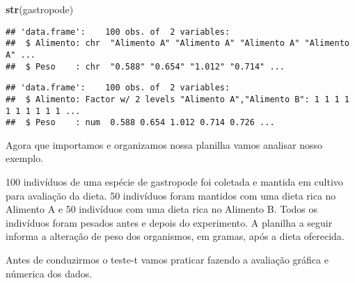 \documentclass[]{book}
\newenvironment{Shaded}{\begin{snugshade}}{\end{snugshade}}
\newcommand{\DataTypeTok}[1]{\textcolor[rgb]{0.13,0.29,0.53}{#1}}
\newcommand{\KeywordTok}[1]{\textcolor[rgb]{0.13,0.29,0.53}{\textbf{#1}}}
\newcommand{\NormalTok}[1]{#1}
\newcommand{\OperatorTok}[1]{\textcolor[rgb]{0.81,0.36,0.00}{\textbf{#1}}}
\newcommand{\StringTok}[1]{\textcolor[rgb]{0.31,0.60,0.02}{#1}}
\begin{document}
\begin{Shaded}
\begin{Highlighting}[]
\KeywordTok{str}\NormalTok{(gastropode)}
\end{Highlighting}
\end{Shaded}

\begin{verbatim}
## 'data.frame':    100 obs. of  2 variables:
##  $ Alimento: chr  "Alimento A" "Alimento A" "Alimento A" "Alimento A" ...
##  $ Peso    : chr  "0.588" "0.654" "1.012" "0.714" ...
\end{verbatim}

\begin{Shaded}
\end{Shaded}

\begin{verbatim}
## 'data.frame':    100 obs. of  2 variables:
##  $ Alimento: Factor w/ 2 levels "Alimento A","Alimento B": 1 1 1 1 1 1 1 1 1 1 ...
##  $ Peso    : num  0.588 0.654 1.012 0.714 0.726 ...
\end{verbatim}

Agora que importamos e organizamos nossa planilha vamos analisar nosso exemplo.

100 indivíduos de uma espécie de gastropode foi coletada e mantida em cultivo para avaliação da dieta. 50 indivíduos foram mantidos com uma dieta rica no Alimento A e 50 indivíduos com uma dieta rica no Alimento B. Todos os indivíduos foram pesados antes e depois do experimento. A planilha a seguir informa a alteração de peso dos organismos, em gramas, após a dieta oferecida.

Antes de conduzirmos o teste-t vamos praticar fazendo a avaliação gráfica e númerica dos dados.

\begin{Shaded}
\end{Shaded}
\end{document}
